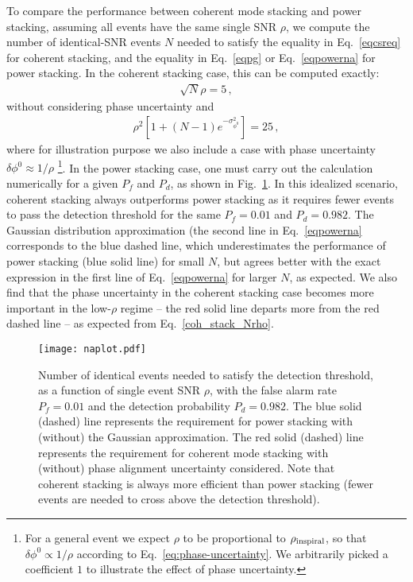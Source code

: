 \documentclass[prd,aps,floatfix,superscriptaddress,nofootinbib,twocolumn,10pt,English]{revtex4-1}
\begin{document}
To compare the performance between coherent mode stacking and power
stacking, assuming all events have the same single SNR $\rho$, we
compute the number of identical-SNR events $N$ needed to satisfy the
equality in Eq.~\eqref{eqcsreq} for coherent stacking, and the
equality in Eq.~\eqref{eqpg} or Eq.~\eqref{eqpowerna} for power
stacking. In the coherent stacking case, this can be computed exactly:
\begin{align}
\sqrt{N} \rho = 5\,,
\end{align}
without considering phase uncertainty and
\begin{align}
  \label{coh_stack_Nrho}
\rho^2 [ 1+(N-1)e^{-\sigma^2_{\phi^0}}] = 25\,,
\end{align}
where for illustration purpose we also include a case with phase
uncertainty $\delta \phi^0 \approx 1/\rho$ \footnote{For a general
  event we expect $\rho$ to be proportional to $\rho_{\rm inspiral}$,
  so that $\delta \phi^0 \propto 1/\rho$ according to
  Eq.~\eqref{eq:phase-uncertainty}. We arbitrarily picked a coefficient $1$ to
  illustrate the effect of phase uncertainty.}.  In the power stacking
case, one must carry out the calculation numerically for a given
$P_{f}$ and $P_{d}$, as shown in Fig.~\ref{fig:na}. In this idealized
scenario, coherent stacking always outperforms power stacking as it
requires fewer events to pass the detection threshold for the same
$P_f =0.01$ and $P_d=0.982$. The Gaussian distribution approximation
(the second line in Eq.~\eqref{eqpowerna} corresponds to the blue
dashed line, which underestimates the performance of power stacking
(blue solid line) for small $N$, but agrees better with the exact
expression in the first line of Eq.~\eqref{eqpowerna} for larger $N$,
as expected. We also find that the phase uncertainty in the coherent
stacking case becomes more important in the low-$\rho$ regime -- the
red solid line departs more from the red dashed line -- as expected
from Eq.~\eqref{coh_stack_Nrho}.





\begin{figure}[tb]
\texttt{[image: naplot.pdf]}
\caption{ Number of identical events needed to satisfy the detection
  threshold, as a function of single event SNR $\rho$, with
  the false alarm rate $P_f=0.01$ and the detection probability
  $P_d=0.982$. The blue solid (dashed) line represents the
  requirement for power stacking with (without) the Gaussian
  approximation. The red solid (dashed) line represents the requirement
  for coherent mode stacking with (without) phase alignment
  uncertainty considered. Note that coherent stacking is always more
  efficient than power stacking (fewer events are needed to cross
  above the detection threshold).}
\label{fig:na}
\end{figure}
\end{document}
